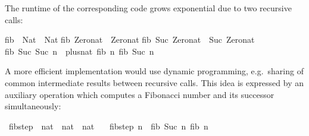 \begin{isabellebody}
\begin{isamarkuptext}
\noindent The runtime of the corresponding code grows exponential due
  to two recursive calls:%
\end{isamarkuptext}%
\isamarkuptrue%
%
\isadelimquotetypewriter
%
\endisadelimquotetypewriter
%
\isatagquotetypewriter
%
\begin{isamarkuptext}%
fib\ {}{}\ Nat\ {}{}\ Nat{}\isanewline
fib\ Zero{}nat\ {}\ Zero{}nat{}\isanewline
fib\ {}Suc\ Zero{}nat{}\ {}\ Suc\ Zero{}nat{}\isanewline
fib\ {}Suc\ {}Suc\ n{}{}\ {}\ plus{}nat\ {}fib\ n{}\ {}fib\ {}Suc\ n{}{}{}\isanewline%
\end{isamarkuptext}%
\isamarkuptrue%
%
\endisatagquotetypewriter
{\isafoldquotetypewriter}%
%
\isadelimquotetypewriter
%
\endisadelimquotetypewriter
%
\begin{isamarkuptext}%
\noindent A more efficient implementation would use dynamic
  programming, e.g.~sharing of common intermediate results between
  recursive calls.  This idea is expressed by an auxiliary operation
  which computes a Fibonacci number and its successor simultaneously:%
\end{isamarkuptext}%
\isamarkuptrue%
%
\isadelimquote
%
\endisadelimquote
%
\isatagquote
{}\isamarkupfalse%
\ fib{}step\ {}{}\ {}nat\ {}\ nat\ {}\ nat{}\ \isanewline
\ \ {}fib{}step\ n\ {}\ {}fib\ {}Suc\ n{}{}\ fib\ n{}{}%

\end{isabellebody}
